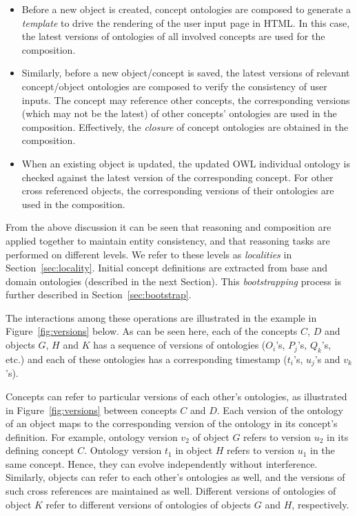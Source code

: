 \documentclass[preprint,12pt]{elsarticle}
\begin{document}
\begin{itemize}
\item Before a new object is created, concept ontologies are composed to generate a \emph{template} to drive the rendering of the user input page in HTML. In this case, the latest versions of ontologies of all involved concepts are used for the composition.

\item Similarly, before a new object/concept is saved, the latest versions of relevant concept/object ontologies are composed to verify the consistency of user inputs. The concept may reference other concepts, the corresponding versions (which may not be the latest) of other concepts' ontologies are used in the composition. Effectively, the \emph{closure} of concept ontologies are obtained in the composition.

\item When an existing object is updated, the updated OWL individual ontology is checked against the latest version of the corresponding concept. For other cross referenced objects, the corresponding versions of their ontologies are used in the composition. 
\end{itemize}

From the above discussion it can be seen that reasoning and composition are applied together to maintain entity consistency, and that reasoning tasks are performed on different levels. We refer to these levels as \emph{localities} in Section~\ref{sec:locality}. Initial concept definitions are extracted from base and domain ontologies (described in the next Section). This \emph{bootstrapping} process is further described in Section~\ref{sec:bootstrap}. 

The interactions among these operations are illustrated in the example in Figure~\ref{fig:versions} below. As can be seen here, each of the concepts $C$, $D$ and objects $G$, $H$ and $K$ has a sequence of versions of ontologies ($O_i$'s, $P_j$'s, $Q_k$'s, etc.) and each of these ontologies has a corresponding timestamp ($t_i$'s, $u_j$'s and $v_k$'s). 

Concepts can refer to particular versions of each other's ontologies, as illustrated in Figure~\ref{fig:versions} between concepts $C$ and $D$. Each version of the ontology of an object maps to the corresponding version of the ontology in its concept's definition. For example, ontology version $v_{2}$ of object $G$ refers to version $u_{2}$ in its defining concept $C$. Ontology version $t_{1}$ in object $H$ refers to version $u_{1}$ in the same concept. Hence, they can evolve independently without interference. Similarly, objects can refer to each other's ontologies as well, and the versions of such cross references are maintained as well. Different versions of ontologies of object $K$ refer to different versions of ontologies of objects $G$ and $H$, respectively.
\end{document}
